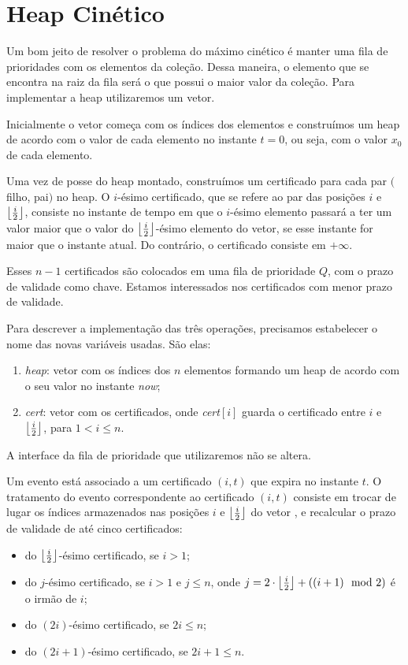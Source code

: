 
\section{Heap Cinético}
\label{heap:secao}
Um bom jeito de resolver o problema do máximo cinético é manter uma
fila de prioridades com os elementos da coleção. Dessa maneira, o
elemento que se encontra na raiz da fila será o que possui o maior
valor da coleção. Para implementar a heap utilizaremos um vetor.

Inicialmente o vetor começa com os índices dos elementos e
construímos um heap de acordo com o valor de cada elemento no
instante $t = 0$, ou seja, com o valor $x_0$ de cada elemento.

Uma vez de posse do heap montado, construímos um certificado para
cada par $($filho, pai$)$ no heap. O $i$-ésimo certificado, que se
refere ao par das posições $i$ e $\left\lfloor \frac{i}{2} \right\rfloor$, consiste no
instante de tempo em que o $i$-ésimo elemento passará a ter um valor
maior que o valor do $\left\lfloor \frac{i}{2} \right\rfloor$-ésimo elemento do vetor,
se esse instante for maior que o instante atual. Do contrário, o
certificado consiste em $+\infty$.

Esses $n - 1$ certificados são colocados em uma fila de prioridade
$Q$, com o prazo de validade como chave. Estamos interessados nos
certificados com menor prazo de validade.

Para descrever a implementação das três operações, precisamos
estabelecer o nome das novas variáveis usadas. São elas:
\begin{enumerate}
    \item \textit{heap}: vetor com os índices dos $n$ elementos
    formando um heap de acordo com o seu valor no instante
    \textit{now};
    \item \textit{cert}: vetor com os certificados, onde
    \textit{cert}$[i]$ guarda o certificado entre $i$ e
    $\left\lfloor \frac{i}{2} \right\rfloor$, para $1 < i \leq n$.
\end{enumerate}

A interface da fila de prioridade que utilizaremos não se altera.



Um evento está associado a um certificado $(i, t)$ que expira no
instante $t$. O tratamento do evento correspondente ao certificado
$(i, t)$ consiste em trocar de lugar os índices armazenados nas
posições $i$ e $\left\lfloor \frac{i}{2} \right\rfloor$ do vetor \heap, e recalcular o
prazo de validade de até cinco certificados:
\begin{itemize}
    \item do $\left\lfloor \frac{i}{2} \right\rfloor$-ésimo certificado, se $i > 1$;
    \item do $j$-ésimo certificado, se $i > 1$ e $j \leq n$,
    onde $j = 2\cdot \left\lfloor \frac{i}{2} \right\rfloor + ((i + 1)\mod2)$
    é o irmão de $i$;
    \item do $(2i)$-ésimo certificado, se $2i \leq n$;
    \item do $(2i + 1)$-ésimo certificado, se $2i + 1 \leq n$.
\end{itemize}

